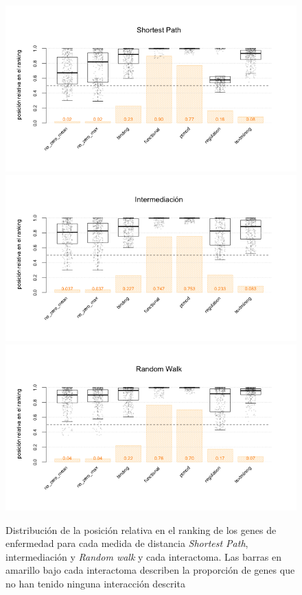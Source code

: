 \begin{figure}[H]
\centering
\includegraphics[scale=0.45]{images/sp_summary.png}
\includegraphics[scale=0.45]{images/inter_summary.png}
\includegraphics[scale=0.45]{images/rw_summary.png}
\caption{Distribución de la posición relativa en el ranking de los genes de enfermedad para cada medida de distancia \emph{Shortest Path}, intermediación y \emph{Random walk} y cada interactoma. Las barras en amarillo bajo cada interactoma describen la proporción de genes que no han tenido ninguna interacción descrita}
\label{fig:distancias}
\end{figure}

